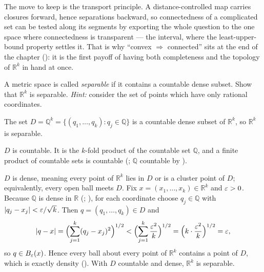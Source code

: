 \documentclass[main.tex]{subfiles}
\begin{document}
\begin{Reflection}
The move to keep is the transport principle. A distance-controlled map carries closures forward, hence
separations backward, so connectedness of a complicated set can be tested along its segments by exporting
the whole question to the one space where connectedness is transparent --- the interval, where the
least-upper-bound property settles it. That is why ``convex $\Rightarrow$ connected'' sits at the end of
the chapter (): it is the first payoff of having both completeness and the topology of
$\mathbb R^{k}$ in hand at once.
\end{Reflection}

A metric space is called \emph{separable} if it contains a countable dense subset. Show that $\mathbb R^k$
is separable. \emph{Hint:} consider the set of points which have only rational coordinates.

\begin{Solution}
The set $D=\mathbb Q^{k}=\{(q_1,\dots,q_k):q_j\in\mathbb Q\}$ is a countable dense subset of $\mathbb R^k$,
so $\mathbb R^k$ is separable.

$D$ is countable. It is the $k$-fold product of the countable set $\mathbb Q$, and a finite product of
countable sets is countable (; $\mathbb Q$ countable by
).

$D$ is dense, meaning every point of $\mathbb R^k$ lies in $D$ or is a cluster point of $D$; equivalently,
every open ball meets $D$. Fix $x=(x_1,\dots,x_k)\in\mathbb R^k$ and $\varepsilon>0$. Because $\mathbb Q$ is dense
in $\mathbb R$ (; ), for each coordinate choose
$q_j\in\mathbb Q$ with $|q_j-x_j|<\varepsilon/\sqrt k$. Then $q=(q_1,\dots,q_k)\in D$ and
\[
|q-x|=\Bigl(\sum_{j=1}^{k}(q_j-x_j)^2\Bigr)^{1/2}
       <\Bigl(\sum_{j=1}^{k}\frac{\varepsilon^2}{k}\Bigr)^{1/2}
       =\Bigl(k\cdot\frac{\varepsilon^2}{k}\Bigr)^{1/2}=\varepsilon,
\]
so $q\in B_\varepsilon(x)$. Hence every ball about every point of $\mathbb R^k$ contains a point of $D$, which is
exactly density (). With $D$ countable and dense, $\mathbb R^k$ is separable.
\end{Solution}
\end{document}
